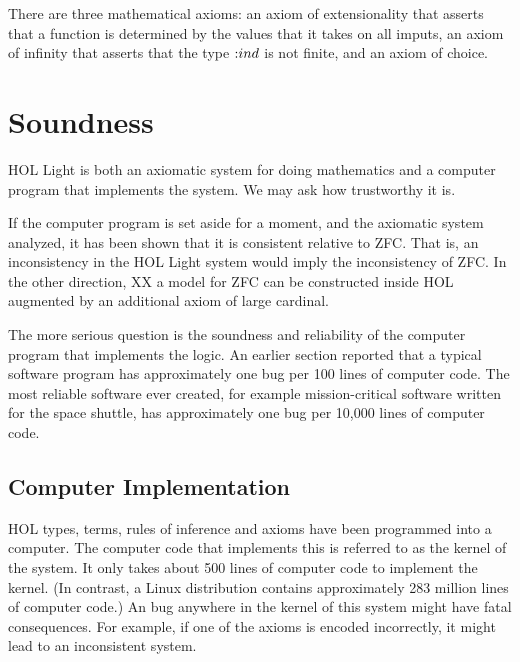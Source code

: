 \documentclass{llncs}
\def\tc{\hbox{:}}
\begin{document}
There are three mathematical axioms: an axiom of extensionality that asserts
that a function is determined by the values that it takes on all imputs,
an axiom of infinity that asserts that the type $\tc ind$ is not finite, and an axiom of choice.



\section{Soundness}

HOL Light is both an axiomatic system for doing mathematics and a computer program that implements the system.
We may ask how trustworthy it is.

If the computer program is set aside for a moment, 
and the axiomatic system analyzed, it has been shown that
it  is consistent relative to ZFC.  That is, an inconsistency in
the HOL Light system would imply the inconsistency of ZFC. 
In the other direction, XX a model for ZFC can
be constructed inside HOL augmented by an additional axiom
of large cardinal. 

The more serious question is the soundness and reliability of the computer program that implements the
logic.  An earlier section reported that a typical software program has approximately one
bug per 100 lines of computer code.  The most reliable software ever created, for example
mission-critical software written for the space shuttle,
has approximately one bug per 10,000 lines of computer
code.  

\subsection{Computer Implementation}




HOL types, terms, rules of inference and axioms have been programmed into a computer.
The computer code that implements this is referred to as the kernel of the system.
It only takes about
500 lines of computer code to implement the kernel.  
(In contrast, a Linux distribution contains approximately
283 million lines of computer code.)
An bug anywhere in the kernel of this system might have fatal consequences.  For example,
if one of the axioms  is encoded incorrectly, it might lead to an inconsistent system.
\end{document}
